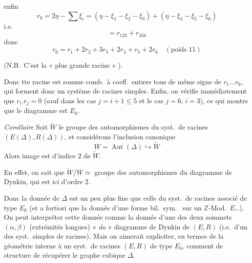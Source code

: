 \documentclass[11pt,a4paper]{article}
\begin{document}
enfin
\[
r_0 = 2\eta - \sum \xi_i = (\eta - \xi_1 - \xi_2 - \xi_3) + (\eta - \xi_4 - \xi_5 - \xi_6)
\]
i.e.
\[
= r_{123} + r_{456}
\]
donc
\[
\boxed{r_0 = r_1 + 2r_2 + 3r_3 + 2r_4 + r_5 + 2r_6} \quad (\text{poids } 11)
\]

(N.B.\ C'est la « plus grande racine » \struck{\ill{}}).

Donc tte racine est somme \struck{\ill{}} comb.\ à coeff.\ entiers tous de
même signe de $r_1 \dots r_6$, qui forment donc un système de racines
simples. Enfin, on vérifie immédiatement que $r_i . r_j = 0$ (sauf dans les
cas  $j = i + 1 \leq 5$ et le cas $j = 6$, $i = 3$), ce
qui montre que le diagramme est $E_6$.

\emph{Corollaire} Soit $\widetilde{W}$ le groupe des automorphismes du syst.\
de racines $(E(\Delta), R(\Delta))$, et considérons l'inclusion canonique
\[
W = \operatorname{Aut}(\Delta) \hookrightarrow \widetilde{W}
\]
Alors \ill{} image est d'indice $2$ de $\widetilde{W}$.

En effet, on sait que $\widetilde{W}/W \simeq$ groupe des automorphismes du
diagramme de Dynkin, qui est ici d'ordre $2$.

Donc la donnée de $\Delta$ est un peu plus fine que celle du syst.\ de
racines associé de type $E_6$ (et a fortiori que la donnée d'une forme bil.\
sym.\  sur un $\mathbb{Z}$-Mod.\ $E$…). On peut
interpréter cette donnée \uncertain{supplémentaire} comme la donnée
\struck{\ill{}} d'une des deux sommets
$(\alpha, \beta)$ (extrémités longues) « \emph{du} » diagramme de Dynkin de
$(E, R)$ (i.e.\ d'un des syst.\ simples de racines). Mais on aimerait
expliciter, en termes de la géométrie interne à \struck{\ill{}} un syst.\
de racines $(E, R)$ de type $E_6$, comment \struck{\ill{}} \add{\ill{}} de
structure \uncertain{permet} de récupérer le graphe cubique $\Delta$.
\end{document}
